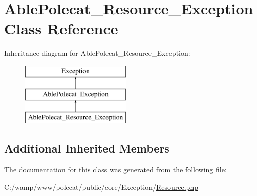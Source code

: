 \hypertarget{class_able_polecat___resource___exception}{}\section{Able\+Polecat\+\_\+\+Resource\+\_\+\+Exception Class Reference}
\label{class_able_polecat___resource___exception}
Inheritance diagram for Able\+Polecat\+\_\+\+Resource\+\_\+\+Exception\+:\begin{figure}[H]
\begin{center}
\leavevmode
\includegraphics[height=3.000000cm]{class_able_polecat___resource___exception}
\end{center}
\end{figure}
\subsection*{Additional Inherited Members}


The documentation for this class was generated from the following file\+:\begin{DoxyCompactItemize}
\item 
C\+:/wamp/www/polecat/public/core/\+Exception/\hyperlink{_exception_2_resource_8php}{Resource.\+php}\end{DoxyCompactItemize}
